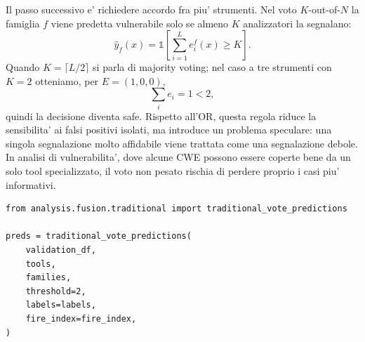 Il passo successivo e' richiedere accordo fra piu' strumenti. Nel voto $K$-out-of-$N$ la famiglia $f$ viene predetta vulnerabile solo se almeno $K$ analizzatori la segnalano:
\begin{equation}
\hat{y}_f(x)=
\mathbb{1}\left[\sum_{i=1}^{L} e_i^f(x) \geq K\right].
\end{equation}
Quando $K=\lceil L/2\rceil$ si parla di majority voting; nel caso a tre strumenti con $K=2$ otteniamo, per $E=(1,0,0)$,
\begin{equation}
\sum_i e_i=1 < 2,
\end{equation}
quindi la decisione diventa safe. Rispetto all'OR, questa regola riduce la sensibilita' ai falsi positivi isolati, ma introduce un problema speculare: una singola segnalazione molto affidabile viene trattata come una segnalazione debole. In analisi di vulnerabilita', dove alcune CWE possono essere coperte bene da un solo tool specializzato, il voto non pesato rischia di perdere proprio i casi piu' informativi.

\begin{lstlisting}[caption={Implementazione K-out-of-N in analysis/fusion/traditional.py}]
from analysis.fusion.traditional import traditional_vote_predictions

preds = traditional_vote_predictions(
    validation_df,
    tools,
    families,
    threshold=2,
    labels=labels,
    fire_index=fire_index,
)
\end{lstlisting}
